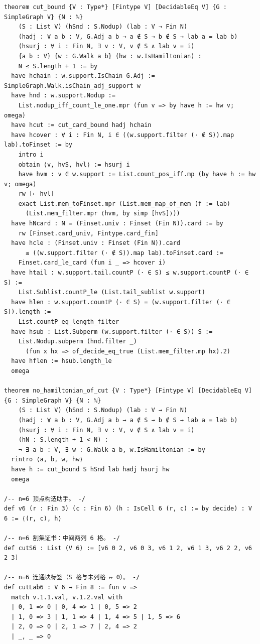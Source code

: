 \documentclass[11pt]{article}
\begin{document}
\begin{lstlisting}
theorem cut_bound {V : Type*} [Fintype V] [DecidableEq V] {G : SimpleGraph V} {N : ℕ}
    (S : List V) (hSnd : S.Nodup) (lab : V → Fin N)
    (hadj : ∀ a b : V, G.Adj a b → a ∉ S → b ∉ S → lab a = lab b)
    (hsurj : ∀ i : Fin N, ∃ v : V, v ∉ S ∧ lab v = i)
    {a b : V} {w : G.Walk a b} (hw : w.IsHamiltonian) :
    N ≤ S.length + 1 := by
  have hchain : w.support.IsChain G.Adj := SimpleGraph.Walk.isChain_adj_support w
  have hnd : w.support.Nodup :=
    List.nodup_iff_count_le_one.mpr (fun v => by have h := hw v; omega)
  have hcut := cut_card_bound hadj hchain
  have hcover : ∀ i : Fin N, i ∈ ((w.support.filter (· ∉ S)).map lab).toFinset := by
    intro i
    obtain ⟨v, hvS, hvl⟩ := hsurj i
    have hvm : v ∈ w.support := List.count_pos_iff.mp (by have h := hw v; omega)
    rw [← hvl]
    exact List.mem_toFinset.mpr (List.mem_map_of_mem (f := lab)
      (List.mem_filter.mpr ⟨hvm, by simp [hvS]⟩))
  have hNcard : N = (Finset.univ : Finset (Fin N)).card := by
    rw [Finset.card_univ, Fintype.card_fin]
  have hcle : (Finset.univ : Finset (Fin N)).card
      ≤ ((w.support.filter (· ∉ S)).map lab).toFinset.card :=
    Finset.card_le_card (fun i _ => hcover i)
  have htail : w.support.tail.countP (· ∈ S) ≤ w.support.countP (· ∈ S) :=
    List.Sublist.countP_le (List.tail_sublist w.support)
  have hlen : w.support.countP (· ∈ S) = (w.support.filter (· ∈ S)).length :=
    List.countP_eq_length_filter
  have hsub : List.Subperm (w.support.filter (· ∈ S)) S :=
    List.Nodup.subperm (hnd.filter _)
      (fun x hx => of_decide_eq_true (List.mem_filter.mp hx).2)
  have hflen := hsub.length_le
  omega

theorem no_hamiltonian_of_cut {V : Type*} [Fintype V] [DecidableEq V] {G : SimpleGraph V} {N : ℕ}
    (S : List V) (hSnd : S.Nodup) (lab : V → Fin N)
    (hadj : ∀ a b : V, G.Adj a b → a ∉ S → b ∉ S → lab a = lab b)
    (hsurj : ∀ i : Fin N, ∃ v : V, v ∉ S ∧ lab v = i)
    (hN : S.length + 1 < N) :
    ¬ ∃ a b : V, ∃ w : G.Walk a b, w.IsHamiltonian := by
  rintro ⟨a, b, w, hw⟩
  have h := cut_bound S hSnd lab hadj hsurj hw
  omega

/-- n=6 顶点构造助手。 -/
def v6 (r : Fin 3) (c : Fin 6) (h : IsCell 6 (r, c) := by decide) : V 6 := ⟨(r, c), h⟩

/-- n=6 割集证书：中间两列 6 格。 -/
def cutS6 : List (V 6) := [v6 0 2, v6 0 3, v6 1 2, v6 1 3, v6 2 2, v6 2 3]

/-- n=6 连通块标签（S 格与未列格 ↦ 0）。 -/
def cutLab6 : V 6 → Fin 8 := fun v =>
  match v.1.1.val, v.1.2.val with
  | 0, 1 => 0 | 0, 4 => 1 | 0, 5 => 2
  | 1, 0 => 3 | 1, 1 => 4 | 1, 4 => 5 | 1, 5 => 6
  | 2, 0 => 0 | 2, 1 => 7 | 2, 4 => 2
  | _, _ => 0


\end{lstlisting}
\end{document}
